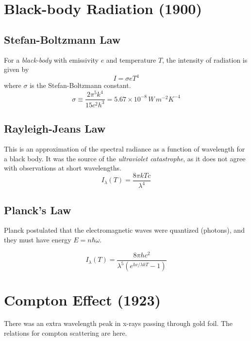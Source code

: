 \section{Black-body Radiation (1900)}


\subsection{Stefan-Boltzmann Law}
For a \textit{black-body} with emissivity $e$ and temperature $T$, the intensity of radiation is given by
\begin{equation} \label{eq:stefan-boltz}
    I = \sigma e T^4
\end{equation}
where $\sigma$ is the Stefan-Boltzmann constant.
\begin{equation} \label{stefan-boltz-const}
    \sigma \equiv \frac{2\pi^5k^4}{15c^2h^3} = 5.67 \times 10^{-8} \, W\,m^{-2} K^{-4}
\end{equation}


\subsection{Rayleigh-Jeans Law}
This is an approximation of the spectral radiance as a function of wavelength for a black body. It was the source of the \textit{ultraviolet catastrophe}, as it does not agree with observations at short wavelengths.
\begin{equation} \label{eq:rayleigh-jeans}
    I_\lambda(T) = \frac{8\pi kTc}{\lambda^4}
\end{equation}


\subsection{Planck's Law}
Planck postulated that the electromagnetic waves were quantized (photons), and they must have energy $E=n\hbar\omega$.

\begin{equation} \label{eq:planck-rad}
    I_\lambda(T) = \frac{8\pi hc^2}{\lambda^5(e^{hc/\lambda kT}-1)}
\end{equation}



\section{Compton Effect (1923)}
There was an extra wavelength peak in x-rays passing through gold foil. The relations for compton scattering are here.

